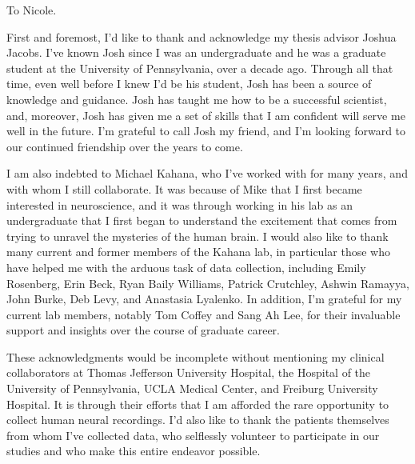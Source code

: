 \begin{preamble}

\iffinal{}{\newpage}

\begin{DUTdedications}
\begin{center}
To Nicole.
\end{center}
\end{DUTdedications}

\iffinal{}{\newpage}

\begin{acknowledgments}
First and foremost, I'd like to thank and acknowledge my thesis advisor Joshua Jacobs. I've known Josh since I was an undergraduate and he was a graduate student at the University of Pennsylvania, over a decade ago. Through all that time, even well before I knew I'd be his student, Josh has been a source of knowledge and guidance. Josh has taught me how to be a successful scientist, and, moreover, Josh has given me a set of skills that I am confident will serve me well in the future. I'm grateful to call Josh my friend, and I'm looking forward to our continued friendship over the years to come.

I am also indebted to Michael Kahana, who I've worked with for many years, and with whom I still collaborate. It was because of Mike that I first became interested in neuroscience, and it was through working in his lab as an undergraduate that I first began to understand the excitement that comes from trying to unravel the mysteries of the human brain. I would also like to thank many current and former members of the Kahana lab, in particular those who have helped me with the arduous task of data collection, including Emily Rosenberg, Erin Beck, Ryan Baily Williams, Patrick Crutchley, Ashwin Ramayya, John Burke, Deb Levy, and Anastasia Lyalenko. In addition, I'm grateful for my current lab members, notably Tom Coffey and Sang Ah Lee, for their invaluable support and insights over the course of graduate career.

These acknowledgments would be incomplete without mentioning my clinical collaborators at Thomas Jefferson University Hospital, the Hospital of the University of Pennsylvania, UCLA Medical Center, and Freiburg University Hospital. It is through their efforts that I am afforded the rare opportunity to collect human neural recordings. I'd also like to thank the patients themselves from whom I've collected data, who selflessly volunteer to participate in our studies and who make this entire endeavor possible.


\end{acknowledgments}
\end{preamble}
